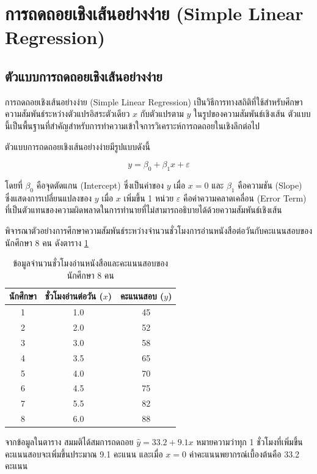 \section{การถดถอยเชิงเส้นอย่างง่าย (Simple Linear Regression)}

\subsection{ตัวแบบการถดถอยเชิงเส้นอย่างง่าย}
การถดถอยเชิงเส้นอย่างง่าย (Simple Linear Regression) เป็นวิธีการทางสถิติที่ใช้สำหรับศึกษาความสัมพันธ์ระหว่างตัวแปรอิสระตัวเดียว $x$ กับตัวแปรตาม $y$ ในรูปของความสัมพันธ์เชิงเส้น ตัวแบบนี้เป็นพื้นฐานที่สำคัญสำหรับการทำความเข้าใจการวิเคราะห์การถดถอยในเชิงลึกต่อไป

ตัวแบบการถดถอยเชิงเส้นอย่างง่ายมีรูปแบบดังนี้

\[
y = \beta_0 + \beta_1 x + \varepsilon
\]

โดยที่ $\beta_0$ คือจุดตัดแกน (Intercept) ซึ่งเป็นค่าของ $y$ เมื่อ $x = 0$ และ $\beta_1$ คือความชัน (Slope) ซึ่งแสดงการเปลี่ยนแปลงของ $y$ เมื่อ $x$ เพิ่มขึ้น 1 หน่วย $\varepsilon$ คือค่าความคลาดเคลื่อน (Error Term) ที่เป็นตัวแทนของความผิดพลาดในการทำนายที่ไม่สามารถอธิบายได้ด้วยความสัมพันธ์เชิงเส้น

\begin{exmp}
\label{exmp:simple_linear_regression_study_hours}
พิจารณาตัวอย่างการศึกษาความสัมพันธ์ระหว่างจำนวนชั่วโมงการอ่านหนังสือต่อวันกับคะแนนสอบของนักศึกษา 8 คน ดังตาราง \ref{tab:study_hours_data}

\begin{table}[h!]
\centering
\caption{ข้อมูลจำนวนชั่วโมงอ่านหนังสือและคะแนนสอบของนักศึกษา 8 คน}
\label{tab:study_hours_data}
\begin{tabular}{|c|c|c|}
\hline
\textbf{นักศึกษา} & \textbf{ชั่วโมงอ่านต่อวัน ($x$)} & \textbf{คะแนนสอบ ($y$)} \\ \hline
1 & 1.0 & 45 \\ \hline
2 & 2.0 & 52 \\ \hline
3 & 3.0 & 58 \\ \hline
4 & 3.5 & 65 \\ \hline
5 & 4.0 & 70 \\ \hline
6 & 4.5 & 75 \\ \hline
7 & 5.5 & 82 \\ \hline
8 & 6.0 & 88 \\ \hline
\end{tabular}
\end{table}

จากข้อมูลในตาราง สมมติได้สมการถดถอย $\hat{y} = 33.2 + 9.1x$ หมายความว่าทุก 1 ชั่วโมงที่เพิ่มขึ้น คะแนนสอบจะเพิ่มขึ้นประมาณ 9.1 คะแนน และเมื่อ $x = 0$ ค่าคะแนนพยากรณ์เบื้องต้นคือ 33.2 คะแนน
\end{exmp}

